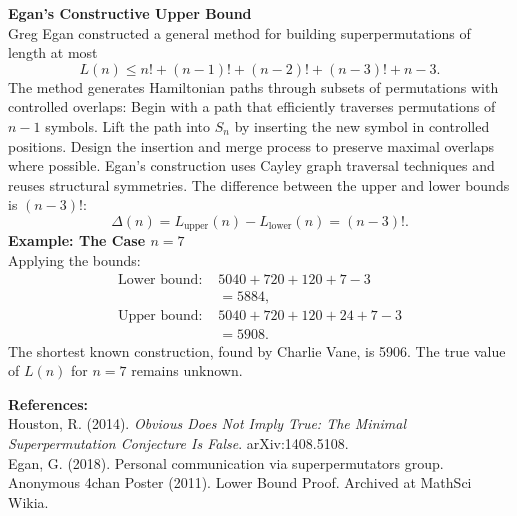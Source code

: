 \begin{technical}
\noindent\textbf{Egan's Constructive Upper Bound}\\
Greg Egan constructed a general method for building superpermutations of length at most
\[
L(n) \leq n! + (n-1)! + (n-2)! + (n-3)! + n - 3.
\]
The method generates Hamiltonian paths through subsets of permutations with controlled overlaps: Begin with a path that efficiently traverses permutations of $n-1$ symbols. Lift the path into $S_n$ by inserting the new symbol in controlled positions. Design the insertion and merge process to preserve maximal overlaps where possible. Egan's construction uses Cayley graph traversal techniques and reuses structural symmetries. The difference between the upper and lower bounds is $(n-3)!$:
\[
\Delta(n) = L_{\text{upper}}(n) - L_{\text{lower}}(n) = (n-3)!.
\]
\noindent\textbf{Example: The Case $n = 7$}\\
Applying the bounds:
\begin{align}
\text{Lower bound: } & 5040 + 720 + 120 + 7 - 3\\
 &= 5884, \\
\text{Upper bound: } & 5040 + 720 + 120 + 24 + 7 - 3\\
 &= 5908.
\end{align}
The shortest known construction, found by Charlie Vane, is 5906. The true value of $L(n)$ for $n = 7$ remains unknown.

\noindent\textbf{References:}\\
Houston, R. (2014). \textit{Obvious Does Not Imply True: The Minimal Superpermutation Conjecture Is False}. arXiv:1408.5108.\\
Egan, G. (2018). Personal communication via superpermutators group.\\
Anonymous 4chan Poster (2011). Lower Bound Proof. Archived at MathSci Wikia.
\end{technical}
